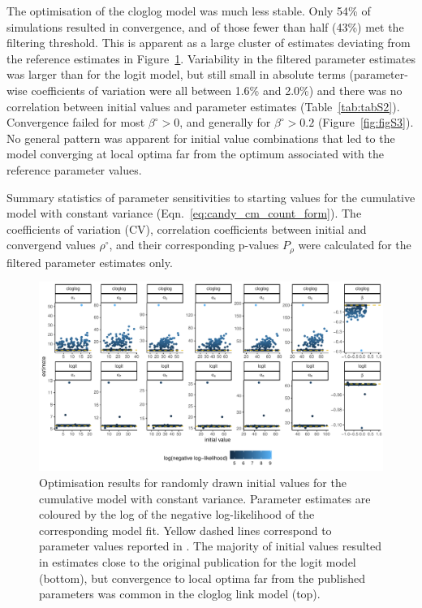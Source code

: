 The optimisation of the cloglog model was much less stable. Only 54\% of simulations resulted in convergence, and of those fewer than half (43\%) met the filtering threshold. This is apparent as a large cluster of estimates deviating from the reference estimates in Figure~\ref{fig:figS1}. Variability in the filtered parameter estimates was larger than for the logit model, but still small in absolute terms (parameter-wise coefficients of variation were all between 1.6\% and 2.0\%) and there was no correlation between initial values and parameter estimates (Table~\ref{tab:tabS2}). Convergence failed for most $\beta^{\circ}>0$, and generally for $\beta^{\circ}>0.2$ (Figure~\ref{fig:figS3}). No general pattern was apparent for initial value combinations that led to the model converging at local optima far from the optimum associated with the reference parameter values.


\begin{table}[bph]
  \small
    \centering
    \caption{Summary statistics of parameter sensitivities to starting values for the cumulative model with constant variance (Eqn.~\ref{eq:candy_cm_count_form}). The coefficients of variation (CV), correlation coefficients between initial and convergend values $\rho^{\circ}$, and their corresponding p-values $P_\rho$ were calculated for the filtered parameter estimates only.
    }
  
  \label{tab:tabS2}
\end{table}


\begin{figure}[htbp]
  \centering
  \includegraphics[width=\textwidth]{../figures/figS1_initial_value_sensitivity_unfiltered.pdf}
  \caption{Optimisation results for randomly drawn initial values for the cumulative model with constant variance. Parameter estimates are coloured by the log of the negative log-likelihood of the corresponding model fit. Yellow dashed lines correspond to parameter values reported in \citep{candy1991modeling}. The majority of initial values resulted in estimates close to the original publication for the logit model (bottom), but convergence to local optima far from the published parameters was common in the cloglog link model (top).}
  \label{fig:figS1}
\end{figure} 

